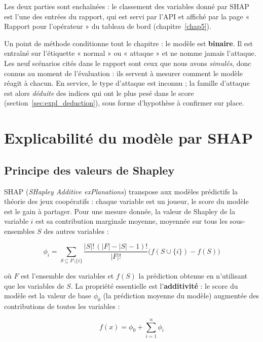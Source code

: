Les deux parties sont enchaînées : le classement des variables donné par
SHAP est l'une des entrées du rapport, qui est servi par l'API et affiché par
la page « Rapport pour l'opérateur » du tableau de bord
(chapitre~\ref{chap5}).

Un point de méthode conditionne tout le chapitre : le modèle est
\textbf{binaire}. Il est entraîné sur l'étiquette « normal » ou « attaque » et
ne nomme jamais l'attaque. Les neuf scénarios cités dans le rapport sont ceux
que nous avons \emph{simulés}, donc connus au moment de l'évaluation : ils
servent à mesurer comment le modèle réagit à chacun. En service, le type
d'attaque est inconnu ; la famille d'attaque est alors \emph{déduite} des
indices qui ont le plus pesé dans le score (section~\ref{sec:expl_deduction}),
sous forme d'hypothèse à confirmer sur place.


\section{Explicabilité du modèle par SHAP}
\label{sec:expl_shap}

\subsection{Principe des valeurs de Shapley}

SHAP (\textit{SHapley Additive exPlanations}) transpose aux modèles
prédictifs la théorie des jeux coopératifs : chaque variable est un joueur,
le score du modèle est le gain à partager. Pour une mesure donnée, la valeur
de Shapley de la variable $i$ est sa contribution marginale moyenne, moyennée
sur tous les sous-ensembles $S$ des autres variables :

\begin{equation}
\phi_i = \sum_{S \subseteq F \setminus \{i\}}
\frac{|S|!\,(|F|-|S|-1)!}{|F|!}\Big(f(S\cup\{i\}) - f(S)\Big)
\label{eq:shapley}
\end{equation}

où $F$ est l'ensemble des variables et $f(S)$ la prédiction obtenue en
n'utilisant que les variables de $S$. La propriété essentielle est
l'\textbf{additivité} : le score du modèle est la valeur de base $\phi_0$
(la prédiction moyenne du modèle) augmentée des contributions de toutes les
variables :

\begin{equation}
f(x) = \phi_0 + \sum_{i=1}^{n} \phi_i
\label{eq:additivite}
\end{equation}

